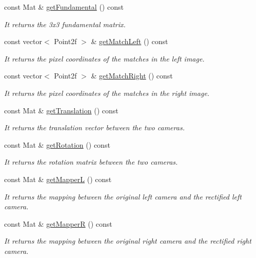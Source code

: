\begin{DoxyCompactItemize}
const Mat \& \hyperlink{classStereoCamera_ab02e0869a054fe23d2b56def81a1a947}{get\+Fundamental} () const
\begin{DoxyCompactList}\small\item\em It returns the 3x3 fundamental matrix. \end{DoxyCompactList}\item 
const vector$<$ Point2f $>$ \& \hyperlink{classStereoCamera_aa50cb648f92d099e1ffbb7bab57c3fc3}{get\+Match\+Left} () const
\begin{DoxyCompactList}\small\item\em It returns the pixel coordinates of the matches in the left image. \end{DoxyCompactList}\item 
const vector$<$ Point2f $>$ \& \hyperlink{classStereoCamera_ac8b01bc577cc3de8e7e8bc246d5c50f0}{get\+Match\+Right} () const
\begin{DoxyCompactList}\small\item\em It returns the pixel coordinates of the matches in the right image. \end{DoxyCompactList}\item 
const Mat \& \hyperlink{classStereoCamera_a3ca6d46fc45835bff5fa0a5753ca40c0}{get\+Translation} () const
\begin{DoxyCompactList}\small\item\em It returns the translation vector between the two cameras. \end{DoxyCompactList}\item 
const Mat \& \hyperlink{classStereoCamera_a08b520f9976fc3213047844fedc02a54}{get\+Rotation} () const
\begin{DoxyCompactList}\small\item\em It returns the rotation matrix between the two cameras. \end{DoxyCompactList}\item 
const Mat \& \hyperlink{classStereoCamera_ae1c7ef2cc1a3de5d10c6bb39fbb78719}{get\+MapperL} () const
\begin{DoxyCompactList}\small\item\em It returns the mapping between the original left camera and the rectified left camera. \end{DoxyCompactList}\item 
const Mat \& \hyperlink{classStereoCamera_ac3f7763fdb6ed57f96924bb0b32b4ea7}{get\+MapperR} () const
\begin{DoxyCompactList}\small\item\em It returns the mapping between the original right camera and the rectified right camera. \end{DoxyCompactList}\item 

\end{DoxyCompactItemize}
